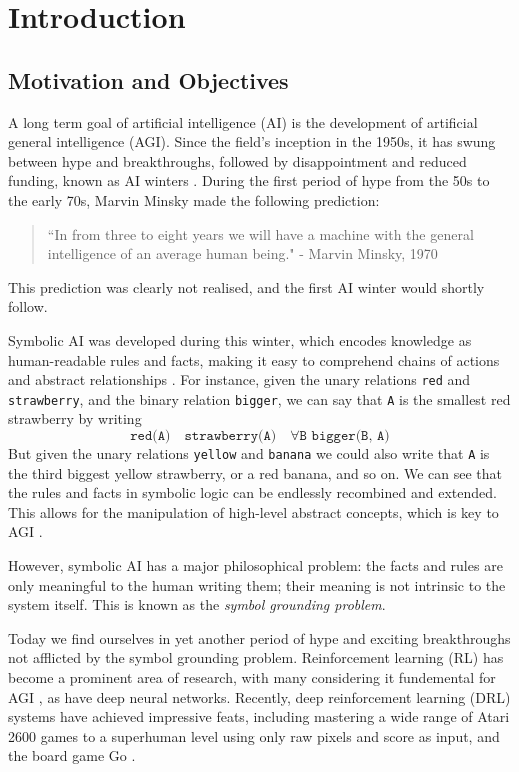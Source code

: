 \chapter{Introduction}

\section{Motivation and Objectives}

A long term goal of artificial intelligence (AI) is the development of artificial general intelligence (AGI). Since the field's inception in the 1950s, it has swung between hype and breakthroughs, followed by disappointment and reduced funding, known as AI winters \cite{Knight2016}. During the first period of hype from the 50s to the early 70s, Marvin Minsky made the following prediction: \cite{Darrach}

\begin{quote} 
\centering 
``In from three to eight years we will have a machine with the general intelligence of an average human being." - Marvin Minsky, 1970
\end{quote}

This prediction was clearly not realised, and the first AI winter would shortly follow.

Symbolic AI was developed during this winter, which encodes knowledge as human-readable rules and facts, making it easy to comprehend chains of actions and abstract relationships \cite{Reingold2001}. For instance, given the unary relations \texttt{red} and \texttt{strawberry}, and the binary relation \texttt{bigger}, we can say that \texttt{A} is the smallest red strawberry by writing $$\texttt{red(A)} \quad \texttt{strawberry(A)} \quad \forall\texttt{B bigger(B, A)}$$ But given the unary relations \texttt{yellow} and \texttt{banana} we could also write that \texttt{A} is the third biggest yellow strawberry, or a red banana, and so on. We can see that the rules and facts in symbolic logic can be endlessly recombined and extended. This allows for the manipulation of high-level abstract concepts, which is key to AGI \cite{Garnelo2016}.

However, symbolic AI has a major philosophical problem: the facts and rules are only meaningful to the human writing them; their meaning is not intrinsic to the system itself. This is known as the \textit{symbol grounding problem}.

Today we find ourselves in yet another period of hype and exciting breakthroughs not afflicted by the symbol grounding problem. Reinforcement learning (RL) has become a prominent area of research, with many considering it fundemental for AGI \cite{Hutter2005}, as have deep neural networks. Recently, deep reinforcement learning (DRL) systems have achieved impressive feats, including mastering a wide range of Atari 2600 games to a superhuman level using only raw pixels and score as input, and the board game Go \cite{Mnih2015, Silver2016}.\\


